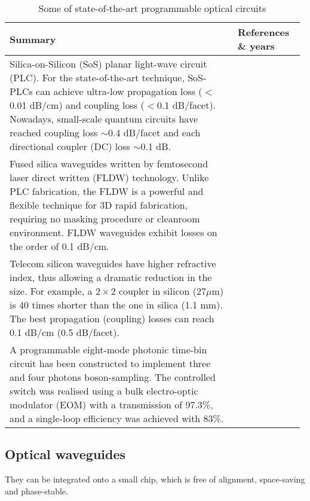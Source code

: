 \begin{table*}[!htbp]
	\begin{tabular}{|p{0.755\linewidth}|p{0.22\linewidth}|}
		\hline
		Summary & References \& years \\
		\hline \hline
		Silica-on-Silicon (SoS) planar light-wave circuit (PLC). For the state-of-the-art technique, SoS-PLCs can achieve ultra-low propagation loss ($<$0.01 dB/cm) and coupling loss ($<$0.1 dB/facet). Nowadays, small-scale quantum circuits have reached coupling loss $\sim$0.4 dB/facet and each directional coupler (DC) loss $\sim$0.1 dB. &  \cite{bib:hibino2003silica, bib:carolan2015universal} \\
		\hline
		Fused silica waveguides written by femtosecond laser direct written (FLDW) technology. Unlike PLC fabrication, the FLDW is a powerful and flexible technique for 3D rapid fabrication, requiring no masking procedure or cleanroom environment. FLDW waveguides exhibit losses on the order of 0.1 dB/cm. & \cite{bib:sakuma2003ultra} \\
		\hline
		Telecom silicon waveguides have higher refractive index, thus allowing a dramatic reduction in the size. For example, a $2 \times 2$ coupler in silicon (27$\mu$m) is 40 times shorter than the one in silica (1.1 mm). The best propagation (coupling) losses can reach 0.1 dB/cm (0.5 dB/facet). &  \cite{bib:bonneau2012quantum, bib:lee2000, bib:almeida2003, bib:mcnab2003} \\
		\hline
		A programmable eight-mode photonic time-bin circuit has been constructed to implement three and four photons boson-sampling. The controlled switch was realised using a bulk electro-optic modulator (EOM) with a transmission of 97.3\%, and a single-loop efficiency was achieved with 83\%.  & \cite{bib:he2017time} \\
		\hline
	\end{tabular}
	\captionspacetab \caption{Some of state-of-the-art programmable optical circuits} \label{tab:waveguide_fibre}
\end{table*}


%
%

\subsection{Optical waveguides} 

They can be integrated onto a small chip, which is free of alignment, space-saving and phase-stable.

